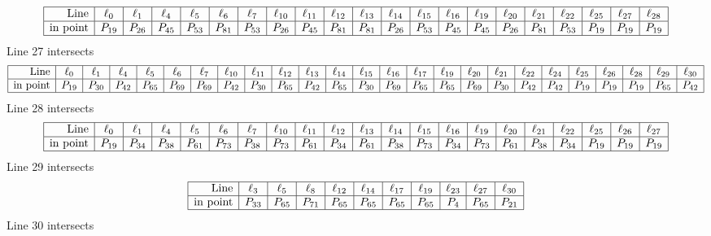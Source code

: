 \documentclass{article}
\begin{document}
{$$\begin{array}{|r*{20}{|c}|}
\hline
\mbox{Line}  & \ell_{0} & \ell_{1} & \ell_{4} & \ell_{5} & \ell_{6} & \ell_{7} & \ell_{10} & \ell_{11} & \ell_{12} & \ell_{13} & \ell_{14} & \ell_{15} & \ell_{16} & \ell_{19} & \ell_{20} & \ell_{21} & \ell_{22} & \ell_{25} & \ell_{27} & \ell_{28}\\
\hline
\mbox{in point}  & P_{19} & P_{26} & P_{45} & P_{53} & P_{81} & P_{53} & P_{26} & P_{45} & P_{81} & P_{81} & P_{26} & P_{53} & P_{45} & P_{45} & P_{26} & P_{81} & P_{53} & P_{19} & P_{19} & P_{19}\\
\hline
\end{array}
$$
Line 27 intersects 
$$
\begin{array}{|r*{24}{|c}|}
\hline
\mbox{Line}  & \ell_{0} & \ell_{1} & \ell_{4} & \ell_{5} & \ell_{6} & \ell_{7} & \ell_{10} & \ell_{11} & \ell_{12} & \ell_{13} & \ell_{14} & \ell_{15} & \ell_{16} & \ell_{17} & \ell_{19} & \ell_{20} & \ell_{21} & \ell_{22} & \ell_{24} & \ell_{25} & \ell_{26} & \ell_{28} & \ell_{29} & \ell_{30}\\
\hline
\mbox{in point}  & P_{19} & P_{30} & P_{42} & P_{65} & P_{69} & P_{69} & P_{42} & P_{30} & P_{65} & P_{42} & P_{65} & P_{30} & P_{69} & P_{65} & P_{65} & P_{69} & P_{30} & P_{42} & P_{42} & P_{19} & P_{19} & P_{19} & P_{65} & P_{42}\\
\hline
\end{array}
$$
Line 28 intersects 
$$
\begin{array}{|r*{20}{|c}|}
\hline
\mbox{Line}  & \ell_{0} & \ell_{1} & \ell_{4} & \ell_{5} & \ell_{6} & \ell_{7} & \ell_{10} & \ell_{11} & \ell_{12} & \ell_{13} & \ell_{14} & \ell_{15} & \ell_{16} & \ell_{19} & \ell_{20} & \ell_{21} & \ell_{22} & \ell_{25} & \ell_{26} & \ell_{27}\\
\hline
\mbox{in point}  & P_{19} & P_{34} & P_{38} & P_{61} & P_{73} & P_{38} & P_{73} & P_{61} & P_{34} & P_{61} & P_{38} & P_{73} & P_{34} & P_{73} & P_{61} & P_{38} & P_{34} & P_{19} & P_{19} & P_{19}\\
\hline
\end{array}
$$
Line 29 intersects 
$$
\begin{array}{|r*{10}{|c}|}
\hline
\mbox{Line}  & \ell_{3} & \ell_{5} & \ell_{8} & \ell_{12} & \ell_{14} & \ell_{17} & \ell_{19} & \ell_{23} & \ell_{27} & \ell_{30}\\
\hline
\mbox{in point}  & P_{33} & P_{65} & P_{71} & P_{65} & P_{65} & P_{65} & P_{65} & P_{4} & P_{65} & P_{21}\\
\hline
\end{array}
$$
Line 30 intersects 
$$
\begin{array}{|r*{10}{|c}|}

\end{array}$$}
\end{document}
